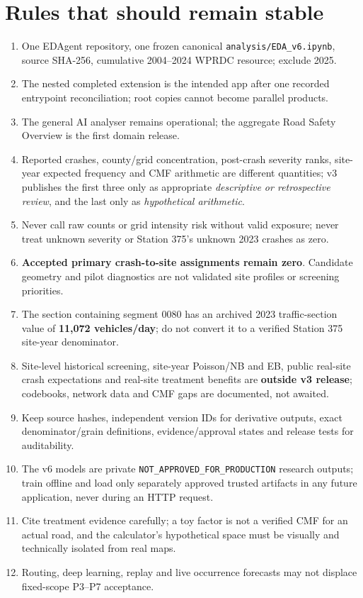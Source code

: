 \documentclass[11pt,a4paper,openany]{report}
\newcommand{\pathcode}[1]{\nolinkurl{#1}}
\begin{document}
\section{Rules that should remain stable}
\begin{enumerate}
\item One EDAgent repository, one frozen canonical \pathcode{analysis/EDA_v6.ipynb}, source SHA-256, cumulative 2004--2024 WPRDC resource; exclude 2025.
\item The nested completed extension is the intended app after one recorded entrypoint reconciliation; root copies cannot become parallel products.
\item The general AI analyser remains operational; the aggregate Road Safety Overview is the first domain release.
\item Reported crashes, county/grid concentration, post-crash severity ranks, site-year expected frequency and CMF arithmetic are different quantities; v3 publishes the first three only as appropriate \emph{descriptive or retrospective review}, and the last only as \emph{hypothetical arithmetic}.
\item Never call raw counts or grid intensity risk without valid exposure; never treat unknown severity or Station 375's unknown 2023 crashes as zero.
\item \textbf{Accepted primary crash-to-site assignments remain zero}. Candidate geometry and pilot diagnostics are not validated site profiles or screening priorities.
\item The section containing segment 0080 has an archived 2023 traffic-section value of \textbf{11,072 vehicles/day}; do not convert it to a verified Station 375 site-year denominator.
\item Site-level historical screening, site-year Poisson/NB and EB, public real-site crash expectations and real-site treatment benefits are \textbf{outside v3 release}; codebooks, network data and CMF gaps are documented, not awaited.
\item Keep source hashes, independent version IDs for derivative outputs, exact denominator/grain definitions, evidence/approval states and release tests for auditability.
\item The v6 models are private \pathcode{NOT_APPROVED_FOR_PRODUCTION} research outputs; train offline and load only separately approved trusted artifacts in any future application, never during an HTTP request.
\item Cite treatment evidence carefully; a toy factor is not a verified CMF for an actual road, and the calculator's hypothetical space must be visually and technically isolated from real maps.
\item Routing, deep learning, replay and live occurrence forecasts may not displace fixed-scope P3--P7 acceptance.
\end{enumerate}
\end{document}
